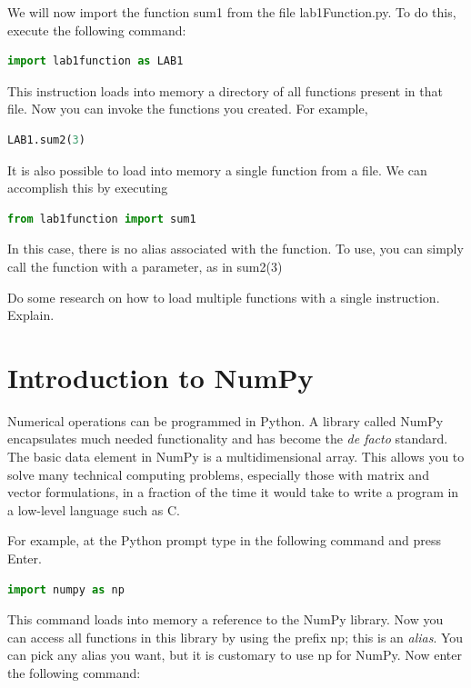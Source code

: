 We will now import the function {\s sum1} from the file {\s lab1Function.py}. To do this,  execute the following command: 

\begin{lstlisting}[language=Python]
	import lab1function as LAB1
\end{lstlisting}

This instruction loads into memory a directory of all functions present in that file. Now you can invoke the functions you created. For example, 

\begin{lstlisting}[language=Python]
	LAB1.sum2(3)
\end{lstlisting}
 
It is also possible to load into memory a single function from a file. We can accomplish this by executing

\begin{lstlisting}[language=Python]
	from lab1function import sum1
\end{lstlisting}

In this case, there is no alias associated with the function. To use, you can simply call the function with a parameter, as in {\s sum2(3)}

Do some research on how to load multiple functions with a single instruction. Explain. \QA

\section{Introduction to NumPy}
Numerical operations can be programmed in Python. A library called {\s NumPy} encapsulates much needed functionality and has become the \textit{de facto} standard. The basic data element in {\s NumPy} is a multidimensional array. This allows you to solve many technical computing problems, especially those with matrix and vector formulations, in a fraction of the time it would take to write a program in a low-level language such as C. 

For example, at the Python prompt type in the following command and press Enter.

\begin{lstlisting}[language=Python]
	import numpy as np  
\end{lstlisting}

This command loads into memory a reference to the NumPy library. Now you can access all functions in this library by using the prefix {\s np}; this is an \textit{alias}. You can pick any alias you want, but it is customary to use {\s np} for NumPy. Now enter the following command: 

